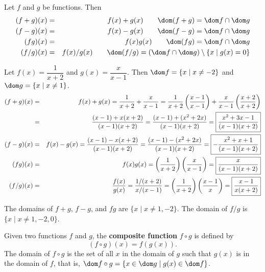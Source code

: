 \documentclass{book}
\begin{document}
\begin{Def} Let $f$ and $g$ be functions. Then
\begin{eqnarray*}
(f+g)(x) &=& f(x) + g(x)\qquad \dom (f+g) = \dom f\cap \dom g\\
(f-g)(x) &=& f(x) - g(x)\qquad \dom (f-g) = \dom f\cap \dom g\\
(fg)(x) &=& f(x)g(x)\qquad \dom (fg) = \dom f\cap \dom g\\
(f/g)(x) &=& f(x)/g(x)\qquad \dom (f/g) = (\dom f\cap \dom g)\setminus \{x\mid g(x)=0\}
\end{eqnarray*}
\end{Def}\vs

\begin{Exam}
Let $f(x) = \dfrac{1}{x+2}$ and $g(x) = \dfrac{x}{x-1}$. Then $\dom f = \{x\mid x\neq -2\}$ and $\dom g = \{x\mid x\neq 1\}$.
\begin{eqnarray*}
(f+g)(x) &=& f(x)+g(x) = \dfrac{1}{x+2}+\dfrac{x}{x-1} = \dfrac{1}{x+2}\left(\dfrac{x-1}{x-1}\right)+\dfrac{x}{x-1}\left(\dfrac{x+2}{x+2}\right)\\
 &=&  \dfrac{(x-1) + x(x+2)}{(x-1)(x+2)} = \dfrac{(x-1) + (x^2+2x)}{(x-1)(x+2)} = \fbox{$\dfrac{x^2+3x-1}{(x-1)(x+2)}$}\\
(f-g)(x)  &=&  f(x) - g(x) = \dfrac{(x-1) - x(x+2)}{(x-1)(x+2)} = \dfrac{(x-1) - (x^2+2x)}{(x-1)(x+2)} = \fbox{$-\dfrac{x^2+x+1}{(x-1)(x+2)}$}\\
(fg)(x) &=& f(x)g(x) = \left(\dfrac{1}{x+2}\right)\left(\dfrac{x}{x-1}\right) = \fbox{$\dfrac{x}{(x-1)(x+2)}$}\\
(f/g)(x) &=& \dfrac{f(x)}{g(x)} = \dfrac{1/(x+2)}{x/(x-1)} = \left(\dfrac{1}{x+2}\right)\left(\dfrac{x-1}{x}\right) = \fbox{$\dfrac{x-1}{x(x+2)}$}
\end{eqnarray*}

The domains of $f+g$, $f-g$, and $fg$ are $\{x\mid x\neq 1,-2\}$. The domain of $f/g$ is $\{x\mid x\neq 1,-2,0\}$.
\end{Exam}\vs

\begin{Def} Given two functions $f$ and $g$, the \textbf{composite function} $f\circ g$ is defined by \[(f\circ g)(x) = f(g(x)).\] The domain of $f\circ g$ is the set of all $x$ in the domain of $g$ such that $g(x)$ is in the domain of $f$, that is, $\dom f\circ g = \{x \in \dom g\mid g(x) \in \dom f\}$.
\end{Def}\vs
\end{document}
